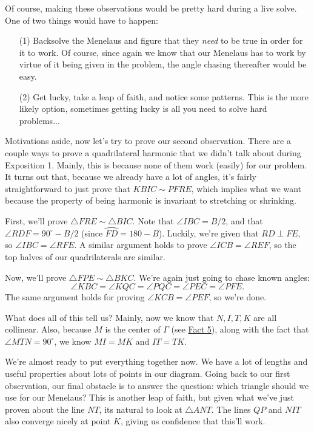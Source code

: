 Of course, making these observations would be pretty hard during a live solve. One of two things would have to happen: 
\begin{enumerate}
    \item [(1)] Backsolve the Menelaus and figure that they \textit{need} to be true in order for it to work. Of course, since again we know that our Menelaus has to work by virtue of it being given in the problem, the angle chasing thereafter would be easy. 
    \item [(2)] Get lucky, take a leap of faith, and notice some patterns. This is the more likely option, sometimes getting lucky is all you need to solve hard problems...
\end{enumerate}

Motivations aside, now let's try to prove our second observation. There are a couple ways to prove a quadrilateral harmonic that we didn't talk about during Exposition 1. Mainly, this is because none of them work (easily) for our problem. It turns out that, because we already have a lot of angles, it's fairly straightforward to just prove that $KBIC\sim PFRE$, which implies what we want because the property of being harmonic is invariant to stretching or shrinking.\V

First, we'll prove $\triangle{FRE}\sim \triangle{BIC}$. Note that $\angle{IBC} = B/2$, and that $\angle{RDF} = 90^{\circ}-B/2$ (since $\wideparen{FD} = 180-B$). Luckily, we're given that $RD\perp FE$, so $\angle{IBC} = \angle{RFE}$. A similar argument holds to prove $\angle{ICB} = \angle{REF}$, so the top halves of our quadrilaterals are similar.\V

Now, we'll prove $\triangle{FPE}\sim \triangle{BKC}$. We're again just going to chase known angles: 
\[\angle{KBC} = \angle{KQC} = \angle{PQC} = \angle{PEC} = \angle{PFE}.\]
The same argument holds for proving $\angle{KCB} = \angle{PEF}$, so we're done.\V

What does all of this tell us? Mainly, now we know that $N,I,T,K$ are all collinear. Also, because $M$ is the center of $\Gamma$ (see \href{https://web.evanchen.cc/handouts/Fact5/Fact5.pdf}{Fact 5}), along with the fact that $\angle{MTN} = 90^{\circ}$, we know $MI = MK$ and $IT = TK$.\V

We're almost ready to put everything together now. We have a lot of lengths and useful properties about lots of points in our diagram. Going back to our first observation, our final obstacle is to answer the question: which triangle should we use for our Menelaus? This is another leap of faith, but given what we've just proven about the line $NT$, its natural to look at $\triangle{ANT}$. The lines $QP$ and $NIT$ also converge nicely at point $K$, giving us confidence that this'll work.\V

